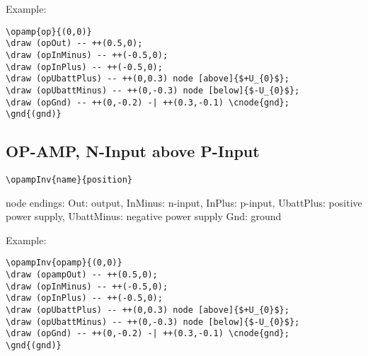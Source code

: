 \documentclass[parskip=full]{scrartcl}
\begin{document}
Example:\\
\begin{minipage}{0.8\textwidth}
\begin{verbatim}
\opamp{op}{(0,0)}
\draw (opOut) -- ++(0.5,0);
\draw (opInMinus) -- ++(-0.5,0);
\draw (opInPlus) -- ++(-0.5,0);
\draw (opUbattPlus) -- ++(0,0.3) node [above]{$+U_{0}$};
\draw (opUbattMinus) -- ++(0,-0.3) node [below]{$-U_{0}$};
\draw (opGnd) -- ++(0,-0.2) -| ++(0.3,-0.1) \cnode{gnd};
\gnd{(gnd)}
\end{verbatim}
\end{minipage}
\begin{minipage}{0.19\textwidth}
\end{minipage}

\subsection{OP-AMP, N-Input above P-Input}

\begin{verbatim}
\opampInv{name}{position}
\end{verbatim}
node endings: Out: output, InMinus: n-input, InPlus: p-input,
              UbattPlus: positive power supply,
              UbattMinus: negative power supply
              Gnd: ground

Example:\\
\begin{minipage}{0.8\textwidth}
\begin{verbatim}
\opampInv{opamp}{(0,0)}
\draw (opampOut) -- ++(0.5,0);
\draw (opInMinus) -- ++(-0.5,0);
\draw (opInPlus) -- ++(-0.5,0);
\draw (opUbattPlus) -- ++(0,0.3) node [above]{$+U_{0}$};
\draw (opUbattMinus) -- ++(0,-0.3) node [below]{$-U_{0}$};
\draw (opGnd) -- ++(0,-0.2) -| ++(0.3,-0.1) \cnode{gnd};
\gnd{(gnd)}
\end{verbatim}
\end{minipage}
\begin{minipage}{0.19\textwidth}
\end{minipage}
\end{document}
